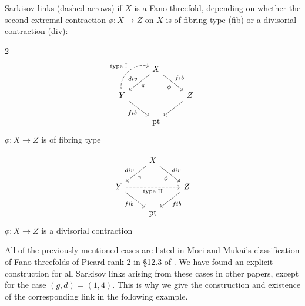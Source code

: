 \documentclass[english,11pt,reqno]{amsart}
\begin{document}
\begin{minipage}{\textwidth }
\hspace{1pt}
Sarkisov links (dashed arrows) if $X$ is a Fano threefold, depending on whether the second extremal contraction $\phi:X\rightarrow Z$ on $X$ is of fibring type (fib) or a divisorial contraction (div):
\begin{multicols}{2}
\centering
\begin{equation*}
\begin{tikzcd} 
	& X \ar[dl, "div"', "\pi"]  \ar[dr, "\phi"', "fib"]& \\
	Y \ar[dr, "fib"']\ar[ur, bend left = 60, dashed, "\textup{type I}"]& & Z \ar[dl,]\\
	&\textup{pt} &
\end{tikzcd} 
\end{equation*}	
$\phi:X \rightarrow Z$ is of fibring type

\begin{equation*}
\begin{tikzcd}
	& X \ar[dl, "div"',"\pi"]  \ar[dr, "div","\phi"']& \\
	Y \ar[dr, "fib"']\ar[rr, dashed, "\textup{type II}"']& & Z \ar[dl,"fib"]\\
	& \textup{pt}&
\end{tikzcd}
\end{equation*}
$\phi:X\rightarrow Z$ is a divisorial contraction
\end{multicols}
\hspace{2pt}
\end{minipage}
%
All of the previously mentioned cases are listed in Mori and Mukai's classification of Fano threefolds of Picard rank 2 in \S 12.3 of \cite{Mori_Mukai-Fano_threefolds_Picard_rank_2}. We have found an explicit construction for all Sarkisov links arising from these cases in other papers, except for the case $(g,d)=(1,4)$. This is why we give the construction and existence of the corresponding link in the following example.
%
%
\end{document}
